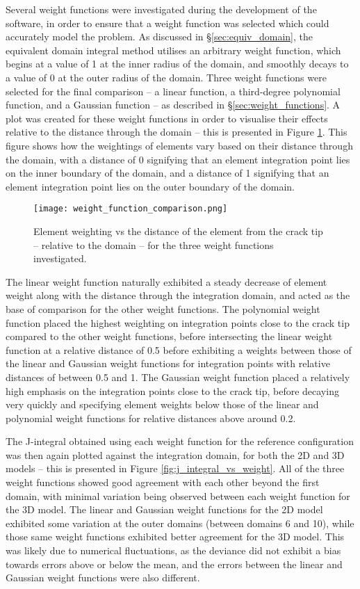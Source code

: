 Several weight functions were investigated during the development of the software, in order to ensure that a weight function was selected which could accurately model the problem. As discussed in §\ref{sec:equiv_domain}, the equivalent domain integral method utilises an arbitrary weight function, which begins at a value of 1 at the inner radius of the domain, and smoothly decays to a value of 0 at the outer radius of the domain. Three weight functions were selected for the final comparison -- a linear function, a third-degree polynomial function, and a Gaussian function -- as described in §\ref{sec:weight_functions}. A plot was created for these weight functions in order to visualise their effects relative to the distance through the domain -- this is presented in Figure \ref{fig:weight_function_comparison}. This figure shows how the weightings of elements vary based on their distance through the domain, with a distance of 0 signifying that an element integration point lies on the inner boundary of the domain, and a distance of 1 signifying that an element integration point lies on the outer boundary of the domain.

\begin{figure}[H]
	\centering
	\texttt{[image: weight\_function\_comparison.png]}
	\caption{Element weighting vs the distance of the element from the crack tip -- relative to the domain -- for the three weight functions investigated.}
	\label{fig:weight_function_comparison}
\end{figure}

 The linear weight function naturally exhibited a steady decrease of element weight along with the distance through the integration domain, and acted as the base of comparison for the other weight functions. The polynomial weight function placed the highest weighting on integration points close to the crack tip compared to the other weight functions, before intersecting the linear weight function at a relative distance of 0.5 before exhibiting a weights between those of the linear and Gaussian weight functions for integration points with relative distances of between 0.5 and 1. The Gaussian weight function placed a relatively high emphasis on the integration points close to the crack tip, before decaying very quickly and specifying element weights below those of the linear and polynomial weight functions for relative distances above around 0.2.
 
 The J-integral obtained using each weight function for the reference configuration was then again plotted against the integration domain, for both the 2D and 3D models -- this is presented in Figure \ref{fig:j_integral_vs_weight}. All of the three weight functions showed good agreement with each other beyond the first domain, with minimal variation being observed between each weight function for the 3D model. The linear and Gaussian weight functions for the 2D model exhibited some variation at the outer domains (between domains 6 and 10), while those same weight functions exhibited better agreement for the 3D model. This was likely due to numerical fluctuations, as the deviance did not exhibit a bias towards errors above or below the mean, and the errors between the linear and Gaussian weight functions were also different.

